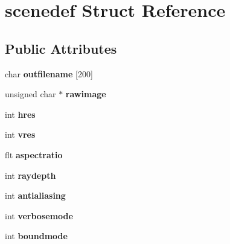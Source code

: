 \hypertarget{structscenedef}{}\section{scenedef Struct Reference}
\label{structscenedef}
\subsection*{Public Attributes}
\begin{DoxyCompactItemize}
\item 
\hypertarget{structscenedef_aee6f522ea4518488c938689c91f8b68d}{}char {\bfseries outfilename} \mbox{[}200\mbox{]}\label{structscenedef_aee6f522ea4518488c938689c91f8b68d}

\item 
\hypertarget{structscenedef_a3bbc900810c3d96a23a7b07ba36d9404}{}unsigned char $\ast$ {\bfseries rawimage}\label{structscenedef_a3bbc900810c3d96a23a7b07ba36d9404}

\item 
\hypertarget{structscenedef_a5c63bad01885f675123f2d19e87b2380}{}int {\bfseries hres}\label{structscenedef_a5c63bad01885f675123f2d19e87b2380}

\item 
\hypertarget{structscenedef_a1a652c5bfa2276aff5ffc6e9fd55ffd7}{}int {\bfseries vres}\label{structscenedef_a1a652c5bfa2276aff5ffc6e9fd55ffd7}

\item 
\hypertarget{structscenedef_aeb2bec451e85b9acaf800e0d22a2e5b3}{}flt {\bfseries aspectratio}\label{structscenedef_aeb2bec451e85b9acaf800e0d22a2e5b3}

\item 
\hypertarget{structscenedef_a1c0c275c0695cc274c40d0b7b39b758a}{}int {\bfseries raydepth}\label{structscenedef_a1c0c275c0695cc274c40d0b7b39b758a}

\item 
\hypertarget{structscenedef_a53ccb8c39e2695bb54d5fc67e407163c}{}int {\bfseries antialiasing}\label{structscenedef_a53ccb8c39e2695bb54d5fc67e407163c}

\item 
\hypertarget{structscenedef_a1eb9cfdc3a42d8a1a628de246d3e8b7a}{}int {\bfseries verbosemode}\label{structscenedef_a1eb9cfdc3a42d8a1a628de246d3e8b7a}

\item 
\hypertarget{structscenedef_a8e43af58e64eb415fb54c93a2b69468b}{}int {\bfseries boundmode}\label{structscenedef_a8e43af58e64eb415fb54c93a2b69468b}


\end{DoxyCompactItemize}
